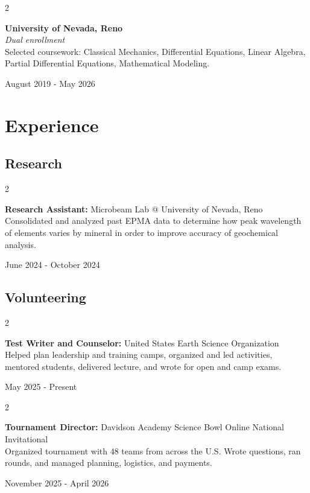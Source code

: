 \documentclass[10pt, letterpaper]{article}
\newenvironment{twocolentry}[2][]{
    \onecolentry
    \def\secondColumn{#2}
    \setcolumnwidth{\fill, 4.5 cm}
    \begin{paracol}{2}
}{
    \switchcolumn \raggedleft \secondColumn
    \end{paracol}
    \endonecolentry
} %
\begin{document}
    \vspace{0.2 cm}

    \begin{twocolentry}{
        August 2019 - May 2026
    }
        \textbf{University of Nevada, Reno} \\
        \textit{Dual enrollment} \\
        Selected coursework: Classical Mechanics, Differential Equations, Linear Algebra, Partial Differential Equations, Mathematical Modeling.
    \end{twocolentry}
    \section{Experience}
    \subsection{Research}
    \begin{twocolentry}{
        June 2024 - October 2024
    }
        \textbf{Research Assistant:} Microbeam Lab @ University of Nevada, Reno \\
        Consolidated and analyzed past EPMA data to determine how peak wavelength of elements varies by mineral in order to improve accuracy of geochemical analysis.
    \end{twocolentry}
      
    \subsection{Volunteering}
    \begin{twocolentry}{
        May 2025 - Present
    }
        \textbf{Test Writer and Counselor:} United States Earth Science Organization \\
        Helped plan leadership and training camps, organized and led activities, mentored students, delivered lecture, and wrote for open and camp exams.
    \end{twocolentry}

    \vspace{0.2 cm}

    \begin{twocolentry}{
        November 2025 - April 2026
    }
        \textbf{Tournament Director:} Davidson Academy Science Bowl Online National Invitational \\
        Organized tournament with 48 teams from across the U.S. Wrote questions, ran rounds, and managed planning, logistics, and payments.
    \end{twocolentry}
\end{document}
